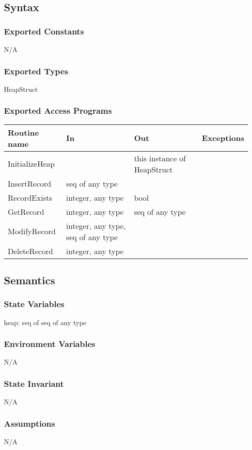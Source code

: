 \documentclass[12pt]{article}
\begin{document}
\subsection{Syntax}
\subsubsection{Exported Constants}
N/A

\subsubsection{Exported Types}
HeapStruct

\subsubsection{Exported Access Programs}
\begin{tabular}{| l | l | l | l |}
\hline
\textbf{Routine name} & \textbf{In} & \textbf{Out} & \textbf{Exceptions}\\
\hline
InitializeHeap &  & this instance of HeapStruct & \\
InsertRecord & seq of any type & & \\
RecordExists & integer, any type & bool & \\
GetRecord & integer, any type & seq of any type & \\
ModifyRecord & integer, any type, seq of any type & &\\ 
DeleteRecord & integer, any type & & \\
\hline
\end{tabular}

\subsection{Semantics}
\subsubsection{State Variables}
heap: seq of seq of any type

\subsubsection{Environment Variables}
N/A
\subsubsection{State Invariant}
N/A
\subsubsection{Assumptions}
N/A
\end{document}
